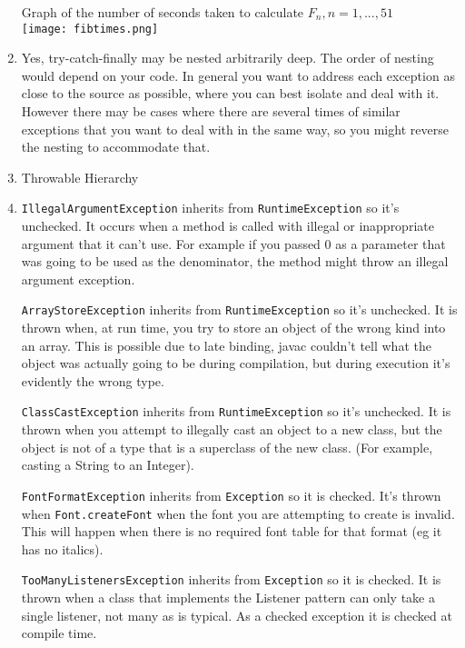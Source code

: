 \documentclass[12pt]{chmullighw}
\begin{document}
\begin{enumerate}
Graph of the number of seconds taken to calculate $F_n, n=1,...,51$ \\
\texttt{[image: fibtimes.png]}


\item Yes, try-catch-finally may be nested arbitrarily deep. The order of nesting would depend on your code. In general you want to address each exception as close to the source as possible, where you can best isolate and deal with it. However there may be cases where there are several times of similar exceptions that you want to deal with in the same way, so you might reverse the nesting to accommodate that.



\item Throwable Hierarchy



\item 
\texttt{IllegalArgumentException} inherits from \texttt{RuntimeException} so it's unchecked. It occurs when a method is called with illegal or inappropriate argument that it can't use. For example if you passed 0 as a parameter that was going to be used as the denominator, the method might throw an illegal argument exception.

\texttt{ArrayStoreException} inherits from \texttt{RuntimeException} so it's unchecked. It is thrown when, at run time, you try to store an object of the wrong kind into an array. This is possible due to late binding, javac couldn't tell what the object was actually going to be during compilation, but during execution it's evidently the wrong type.

\texttt{ClassCastException} inherits from \texttt{RuntimeException} so it's unchecked. It is thrown when you attempt to illegally cast an object to a new class, but the object is not of a type that is a superclass of the new class. (For example, casting a String to an Integer). 

\texttt{FontFormatException} inherits from \texttt{Exception} so it is checked. It's thrown when \texttt{Font.createFont} when the font you are attempting to create is invalid. This will happen when there is no required font table for that format (eg it has no italics).

\texttt{TooManyListenersException} inherits from \texttt{Exception} so it is checked. It is thrown when a class that implements the Listener pattern can only take a single listener, not many as is typical. As a checked exception it is checked at compile time.



\end{enumerate}
\end{document}
